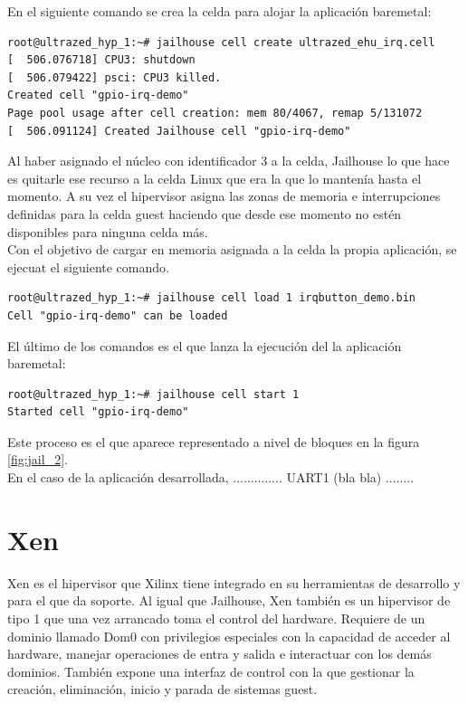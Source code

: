 En el siguiente comando se crea la celda para alojar la aplicación baremetal:

\begin{lstlisting}[style=CStyle]
root@ultrazed_hyp_1:~# jailhouse cell create ultrazed_ehu_irq.cell
[  506.076718] CPU3: shutdown
[  506.079422] psci: CPU3 killed.
Created cell "gpio-irq-demo"
Page pool usage after cell creation: mem 80/4067, remap 5/131072
[  506.091124] Created Jailhouse cell "gpio-irq-demo"
\end{lstlisting}

Al haber asignado el núcleo con identificador 3 a la celda, Jailhouse lo que hace es quitarle ese recurso a la celda Linux que era la que lo mantenía hasta el momento. A su vez el hipervisor asigna las zonas de memoria e interrupciones definidas para la celda guest haciendo que desde ese momento no estén disponibles para ninguna celda más.\\

Con el objetivo de cargar en memoria asignada a la celda la propia aplicación, se ejecuat el siguiente comando.
\begin{lstlisting}[style=CStyle]
root@ultrazed_hyp_1:~# jailhouse cell load 1 irqbutton_demo.bin
Cell "gpio-irq-demo" can be loaded
\end{lstlisting}

El último de los comandos es el que lanza la ejecución del la aplicación baremetal:
\begin{lstlisting}[style=CStyle]
root@ultrazed_hyp_1:~# jailhouse cell start 1
Started cell "gpio-irq-demo"
\end{lstlisting}

Este proceso es el que aparece representado a nivel de bloques en la figura \ref{fig:jail_2}.\\

En el caso de la aplicación desarrollada, .............. UART1 (bla bla) ........

\section{Xen}

Xen es el hipervisor que Xilinx tiene integrado en su herramientas de desarrollo y para el que da soporte. Al igual que Jailhouse, Xen también es un hipervisor de tipo 1 que una vez arrancado toma el control del hardware. Requiere de un dominio llamado Dom0 con privilegios especiales con la capacidad de acceder al hardware, manejar operaciones de entra y salida e interactuar con los demás dominios. También expone una interfaz de control con la que gestionar la creación, eliminación, inicio y parada de sistemas guest.


